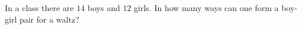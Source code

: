 In a class there are $14$ boys and $12$ girls. In how many ways can one form a boy-girl pair for a waltz?

